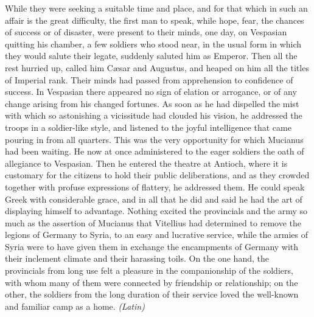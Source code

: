 
While they were seeking a suitable time and place, and for that which in such an affair is the great difficulty, the first man to speak, while hope, fear, the chances of success or of disaster, were present to their minds, one day, on Vespasian quitting his chamber, a few soldiers who stood near, in the usual form in which they would salute their legate, suddenly saluted him as Emperor. Then all the rest hurried up, called him Cæsar and Augustus, and heaped on him all the titles of Imperial rank. Their minds had passed from apprehension to confidence of success. In Vespasian there appeared no sign of elation or arrogance, or of any change arising from his changed fortunes. As soon as he had dispelled the mist with which so astonishing a vicissitude had clouded his vision, he addressed the troops in a soldier-like style, and listened to the joyful intelligence that came pouring in from all quarters. This was the very opportunity for which Mucianus had been waiting. He now at once administered to the eager soldiers the oath of allegiance to Vespasian. Then he entered the theatre at Antioch, where it is customary for the citizens to hold their public deliberations, and as they crowded together with profuse expressions of flattery, he addressed them. He could speak Greek with considerable grace, and in all that he did and said he had the art of displaying himself to advantage. Nothing excited the provincials and the army so much as the assertion of Mucianus that Vitellius had determined to remove the legions of Germany to Syria, to an easy and lucrative service, while the armies of Syria were to have given them in exchange the encampments of Germany with their inclement climate and their harassing toils. On the one hand, the provincials from long use felt a pleasure in the companionship of the soldiers, with whom many of them were connected by friendship or relationship; on the other, the soldiers from the long duration of their service loved the well-known and familiar camp as a home. \emph{(Latin)}


